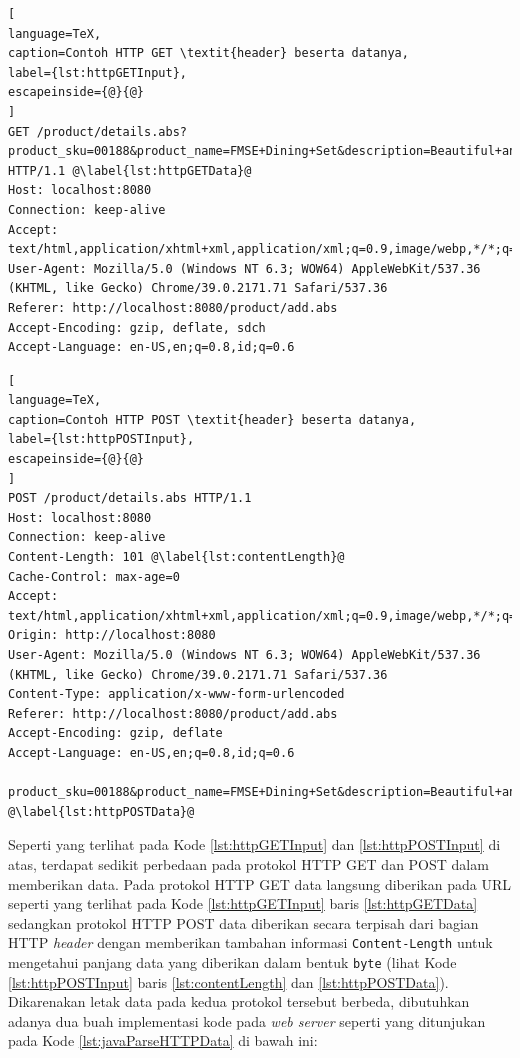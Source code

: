 \begin{lstlisting}[
language=TeX,
caption=Contoh HTTP GET \textit{header} beserta datanya,
label={lst:httpGETInput},
escapeinside={@}{@}
]
GET /product/details.abs?product_sku=00188&product_name=FMSE+Dining+Set&description=Beautiful+and+Cute+Dining+Set&price=250000 HTTP/1.1 @\label{lst:httpGETData}@
Host: localhost:8080
Connection: keep-alive
Accept: text/html,application/xhtml+xml,application/xml;q=0.9,image/webp,*/*;q=0.8
User-Agent: Mozilla/5.0 (Windows NT 6.3; WOW64) AppleWebKit/537.36 (KHTML, like Gecko) Chrome/39.0.2171.71 Safari/537.36
Referer: http://localhost:8080/product/add.abs
Accept-Encoding: gzip, deflate, sdch
Accept-Language: en-US,en;q=0.8,id;q=0.6
\end{lstlisting}

\begin{lstlisting}[
language=TeX,
caption=Contoh HTTP POST \textit{header} beserta datanya,
label={lst:httpPOSTInput},
escapeinside={@}{@}
]
POST /product/details.abs HTTP/1.1
Host: localhost:8080
Connection: keep-alive
Content-Length: 101 @\label{lst:contentLength}@
Cache-Control: max-age=0
Accept: text/html,application/xhtml+xml,application/xml;q=0.9,image/webp,*/*;q=0.8
Origin: http://localhost:8080
User-Agent: Mozilla/5.0 (Windows NT 6.3; WOW64) AppleWebKit/537.36 (KHTML, like Gecko) Chrome/39.0.2171.71 Safari/537.36
Content-Type: application/x-www-form-urlencoded
Referer: http://localhost:8080/product/add.abs
Accept-Encoding: gzip, deflate
Accept-Language: en-US,en;q=0.8,id;q=0.6

product_sku=00188&product_name=FMSE+Dining+Set&description=Beautiful+and+Cute+Dining+Set&price=250000 @\label{lst:httpPOSTData}@
\end{lstlisting}

Seperti yang terlihat pada Kode \ref{lst:httpGETInput} dan \ref{lst:httpPOSTInput} di atas, terdapat sedikit perbedaan pada protokol HTTP GET dan POST dalam memberikan data. Pada protokol HTTP GET data langsung diberikan pada URL seperti yang terlihat pada Kode \ref{lst:httpGETInput} baris \ref{lst:httpGETData} sedangkan protokol HTTP POST data diberikan secara terpisah dari bagian HTTP \textit{header} dengan memberikan tambahan informasi \texttt{Content-Length} untuk mengetahui panjang data yang diberikan dalam bentuk \texttt{byte} (lihat Kode \ref{lst:httpPOSTInput} baris \ref{lst:contentLength} dan \ref{lst:httpPOSTData}). Dikarenakan letak data pada kedua protokol tersebut berbeda, dibutuhkan adanya dua buah implementasi kode pada \textit{web server} seperti yang ditunjukan pada Kode \ref{lst:javaParseHTTPData} di bawah ini:

